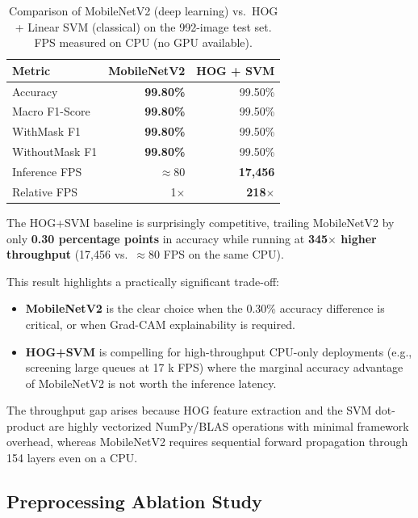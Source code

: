 \documentclass[11pt,a4paper]{article}
\begin{document}
\begin{table}[H]
\centering
\caption{Comparison of MobileNetV2 (deep learning) vs.\ HOG + Linear SVM
(classical) on the 992-image test set. FPS measured on CPU (no GPU available).}
\label{tab:comparison}
\begin{tabular}{lrr}
\toprule
Metric & MobileNetV2 & HOG + SVM \\
\midrule
Accuracy        & \textbf{99.80\%} & 99.50\% \\
Macro F1-Score  & \textbf{99.80\%} & 99.50\% \\
WithMask F1     & \textbf{99.80\%} & 99.50\% \\
WithoutMask F1  & \textbf{99.80\%} & 99.50\% \\
Inference FPS   & $\approx$80      & \textbf{17,456} \\
\midrule
Relative FPS    & 1$\times$        & \textbf{218$\times$} \\
\bottomrule
\end{tabular}
\end{table}

The HOG+SVM baseline is surprisingly competitive, trailing MobileNetV2 by only
\textbf{0.30 percentage points} in accuracy while running at
\textbf{345$\times$ higher throughput} (17,456 vs.\ $\approx$80 FPS on the same CPU).

This result highlights a practically significant trade-off:
\begin{itemize}[nosep, leftmargin=1.5em]
    \item \textbf{MobileNetV2} is the clear choice when the 0.30\% accuracy
          difference is critical, or when Grad-CAM explainability is required.
    \item \textbf{HOG+SVM} is compelling for high-throughput CPU-only deployments
          (e.g., screening large queues at 17 k FPS) where the marginal accuracy
          advantage of MobileNetV2 is not worth the inference latency.
\end{itemize}

The throughput gap arises because HOG feature extraction and the SVM dot-product
are highly vectorized NumPy/BLAS operations with minimal framework overhead,
whereas MobileNetV2 requires sequential forward propagation through 154 layers
even on a CPU.

\subsection{Preprocessing Ablation Study}
\label{sec:ablation}
\end{document}
